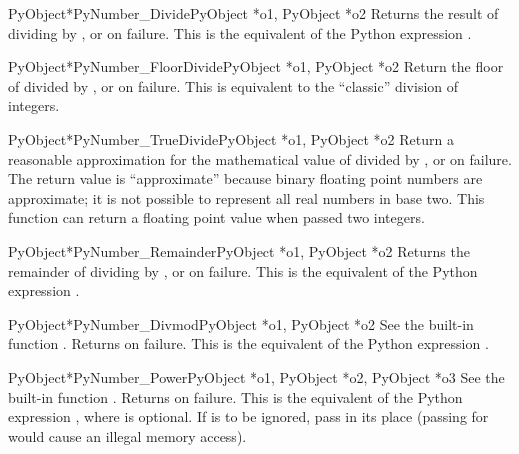 \begin{cfuncdesc}{PyObject*}{PyNumber_Divide}{PyObject *o1, PyObject *o2}
  Returns the result of dividing  by , or \NULL{} on
  failure.  This is the equivalent of the Python expression
  .
\end{cfuncdesc}


\begin{cfuncdesc}{PyObject*}{PyNumber_FloorDivide}{PyObject *o1, PyObject *o2}
  Return the floor of  divided by , or \NULL{} on
  failure.  This is equivalent to the ``classic'' division of
  integers.
\end{cfuncdesc}


\begin{cfuncdesc}{PyObject*}{PyNumber_TrueDivide}{PyObject *o1, PyObject *o2}
  Return a reasonable approximation for the mathematical value of
   divided by , or \NULL{} on failure.  The return
  value is ``approximate'' because binary floating point numbers are
  approximate; it is not possible to represent all real numbers in
  base two.  This function can return a floating point value when
  passed two integers.
\end{cfuncdesc}


\begin{cfuncdesc}{PyObject*}{PyNumber_Remainder}{PyObject *o1, PyObject *o2}
  Returns the remainder of dividing  by , or \NULL{}
  on failure.  This is the equivalent of the Python expression
  .
\end{cfuncdesc}


\begin{cfuncdesc}{PyObject*}{PyNumber_Divmod}{PyObject *o1, PyObject *o2}
  See the built-in function .
  Returns \NULL{} on failure.  This is the equivalent of the Python
  expression .
\end{cfuncdesc}


\begin{cfuncdesc}{PyObject*}{PyNumber_Power}{PyObject *o1,
                                             PyObject *o2, PyObject *o3}
  See the built-in function .
  Returns \NULL{} on failure.  This is the equivalent of the Python
  expression , where 
  is optional.  If  is to be ignored, pass  in
  its place (passing \NULL{} for  would cause an illegal
  memory access).
\end{cfuncdesc}


